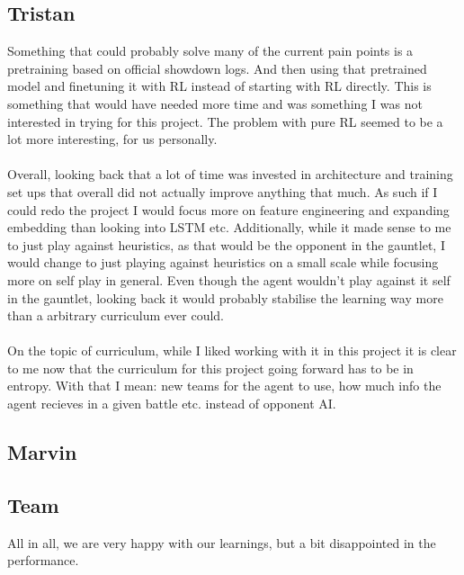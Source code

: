 \subsection{Tristan}
Something that could probably solve many of the current pain points is a pretraining based on official showdown logs. And then using that pretrained model and finetuning it with RL instead of starting with RL directly. This is something that would have needed more time and was something I was not interested in trying for this project. The problem with pure RL seemed to be a lot more interesting, for us personally.
\\ 
\\
Overall, looking back that a lot of time was invested in architecture and training set ups that overall did not actually improve anything that much. As such if I could redo the project I would focus more on feature engineering and expanding embedding than looking into LSTM etc. Additionally, while it made sense to me to just play against heuristics, as that would be the opponent in the gauntlet, I would change to just playing against heuristics on a small scale while focusing more on self play in general. Even though the agent wouldn't play against it self in the gauntlet, looking back it would probably stabilise the learning way more than a arbitrary curriculum ever could.
\\
\\
On the topic of curriculum, while I liked working with it in this project it is clear to me now that the curriculum for this project going forward has to be in entropy. With that I mean: new teams for the agent to use, how much info the agent recieves in a given battle etc. instead of opponent AI. 

\subsection{Marvin}

\subsection{Team}
All in all, we are very happy with our learnings, but a bit disappointed in the performance. 
